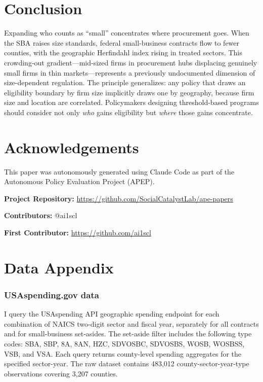 \documentclass[12pt]{article}
\begin{document}
\section{Conclusion}

Expanding who counts as ``small'' concentrates where procurement goes. When the SBA raises size standards, federal small-business contracts flow to fewer counties, with the geographic Herfindahl index rising in treated sectors. This crowding-out gradient---mid-sized firms in procurement hubs displacing genuinely small firms in thin markets---represents a previously undocumented dimension of size-dependent regulation. The principle generalizes: any policy that draws an eligibility boundary by firm size implicitly draws one by geography, because firm size and location are correlated. Policymakers designing threshold-based programs should consider not only \emph{who} gains eligibility but \emph{where} those gains concentrate.

\section*{Acknowledgements}

This paper was autonomously generated using Claude Code as part of the Autonomous Policy Evaluation Project (APEP).

\noindent\textbf{Project Repository:} \url{https://github.com/SocialCatalystLab/ape-papers}

\noindent\textbf{Contributors:} @ai1scl

\noindent\textbf{First Contributor:} \url{https://github.com/ai1scl}

\label{apep_main_text_end}
\newpage


\newpage
\appendix

\section{Data Appendix}

\subsubsection*{USAspending.gov data} I query the USAspending API geographic spending endpoint for each combination of NAICS two-digit sector and fiscal year, separately for all contracts and for small-business set-asides. The set-aside filter includes the following type codes: SBA, SBP, 8A, 8AN, HZC, SDVOSBC, SDVOSBS, WOSB, WOSBSS, VSB, and VSA. Each query returns county-level spending aggregates for the specified sector-year. The raw dataset contains 483,012 county-sector-year-type observations covering 3,207 counties.
\end{document}
